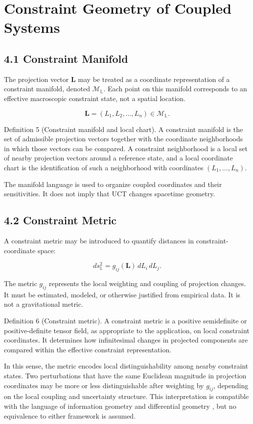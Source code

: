 ﻿\section{Constraint Geometry of Coupled Systems}


\subsection{4.1 Constraint Manifold}

The projection vector \(\mathbf{L}\) may be treated as a coordinate representation of a constraint manifold, denoted \(\mathcal{M}_{\mathbb{L}}\). Each point on this manifold corresponds to an effective macroscopic constraint state, not a spatial location.

\[ \mathbf{L}=(L_1,L_2,\ldots,L_n)\in\mathcal{M}_{\mathbb{L}}. \]

Definition 5 (Constraint manifold and local chart). A constraint manifold is the set of admissible projection vectors together with the coordinate neighborhoods in which those vectors can be compared. A constraint neighborhood is a local set of nearby projection vectors around a reference state, and a local coordinate chart is the identification of such a neighborhood with coordinates \((L_1,\ldots,L_n)\).

The manifold language is used to organize coupled coordinates and their sensitivities. It does not imply that UCT changes spacetime geometry.

\subsection{4.2 Constraint Metric}

A constraint metric may be introduced to quantify distances in constraint-coordinate space:

\[ ds_{\mathbb{L}}^2=g_{ij}(\mathbf{L})\,dL_i\,dL_j. \]

The metric \(g_{ij}\) represents the local weighting and coupling of projection changes. It must be estimated, modeled, or otherwise justified from empirical data. It is not a gravitational metric.

Definition 6 (Constraint metric). A constraint metric is a positive semidefinite or positive-definite tensor field, as appropriate to the application, on local constraint coordinates. It determines how infinitesimal changes in projected components are compared within the effective constraint representation.

In this sense, the metric encodes local distinguishability among nearby constraint states. Two perturbations that have the same Euclidean magnitude in projection coordinates may be more or less distinguishable after weighting by \(g_{ij}\), depending on the local coupling and uncertainty structure. This interpretation is compatible with the language of information geometry \cite{AmariNagaoka2000,Rao1945} and differential geometry \cite{Lee2012Smooth,Lee1997Riemannian}, but no equivalence to either framework is assumed.

